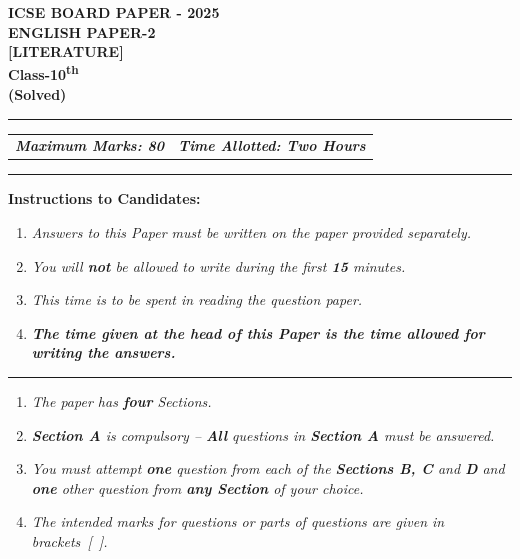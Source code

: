 \documentclass[12pt,a4paper]{article}
\begin{document}
\begin{center}
    {\LARGE\bfseries ICSE BOARD PAPER - 2025}\\[4pt]
    {\Large\bfseries ENGLISH PAPER-2}\\[4pt]
    {\Large\bfseries [LITERATURE]}\\[4pt]
    {\Large\bfseries Class-10\textsuperscript{th}}\\[4pt]
    {\Large\bfseries (Solved)}
\end{center}

\vspace{6pt}

\noindent\rule{\textwidth}{0.8pt}
\vspace{-6pt}

\noindent\begin{tabularx}{\textwidth}{@{}X r@{}}
\textbf{\textit{Maximum Marks: 80}} & \textbf{\textit{Time Allotted: Two Hours}}
\end{tabularx}

\vspace{-2pt}
\noindent\rule{\textwidth}{0.4pt}

\vspace{6pt}

\textbf{Instructions to Candidates:}
\begin{enumerate}[leftmargin=0.8cm, itemsep=1pt, topsep=2pt]
    \item \textit{Answers to this Paper must be written on the paper provided separately.}
    \item \textit{You will \textbf{not} be allowed to write during the first \textbf{15} minutes.}
    \item \textit{This time is to be spent in reading the question paper.}
    \item \textit{\textbf{The time given at the head of this Paper is the time allowed for writing the answers.}}
\end{enumerate}

\vspace{2pt}
\noindent\rule{\textwidth}{0.4pt}
\vspace{4pt}

\begin{enumerate}[leftmargin=0.8cm, itemsep=1pt, topsep=2pt, start=5]
    \item \textit{The paper has \textbf{four} Sections.}
    \item \textit{\textbf{Section A} is compulsory -- \textbf{All} questions in \textbf{Section A} must be answered.}
    \item \textit{You must attempt \textbf{one} question from each of the \textbf{Sections B, C} and \textbf{D} and \textbf{one} other question from \textbf{any Section} of your choice.}
    \item \textit{The intended marks for questions or parts of questions are given in brackets~[~].}
\end{enumerate}
\end{document}
